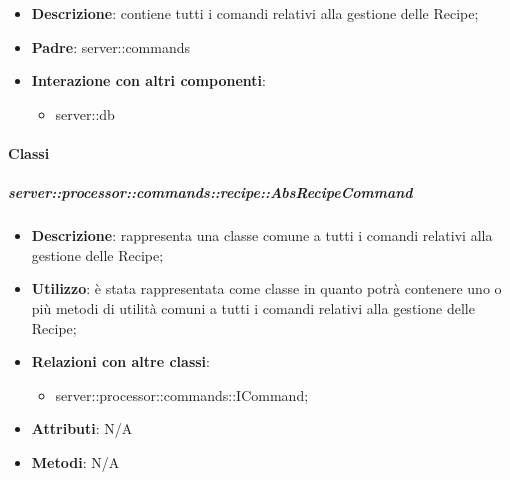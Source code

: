       \begin{itemize}
        \item \textbf{Descrizione}: contiene tutti i comandi relativi alla gestione delle Recipe;
        \item \textbf{Padre}: server::commands
        \item \textbf{Interazione con altri componenti}:
          \begin{itemize}
            \item server::db
          \end{itemize}
      \end{itemize}

        \paragraph{Classi} %

        \subparagraph{server::processor::commands::recipe::AbsRecipeCommand} %
        \label{subp:bdsm_app_server_processor_commands_recipe_absrecipecommand}
        \begin{itemize}
          \item \textbf{Descrizione}: rappresenta una classe comune a tutti i comandi relativi alla gestione delle Recipe;
          \item \textbf{Utilizzo}: è stata rappresentata come classe in quanto potrà contenere uno o più metodi di utilità comuni a tutti i comandi relativi alla gestione delle Recipe;
          \item \textbf{Relazioni con altre classi}:
            \begin{itemize}
              \item server::processor::commands::ICommand;
            \end{itemize}
			\item \textbf{Attributi}: N/A
			\item \textbf{Metodi}: N/A
        \end{itemize}

